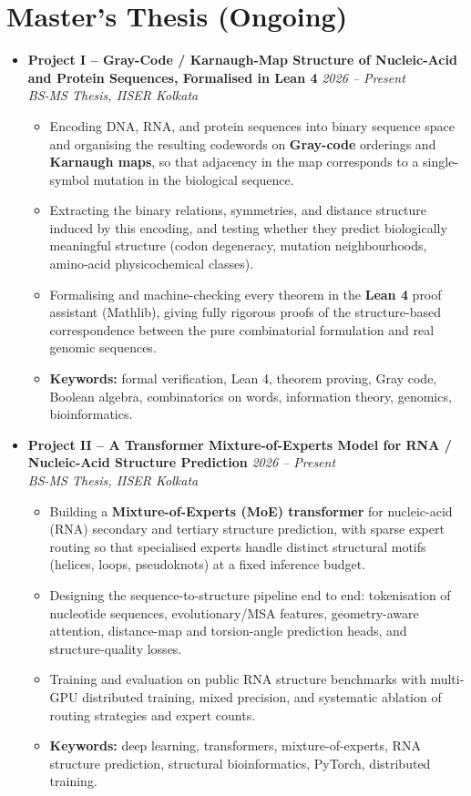 \documentclass[a4paper,10pt]{article}
\newcommand{\resumeProject}[4]{
    \item\small{
        \textbf{#1} \hfill \textit{#2}\\
        \textit{#3}\\
        \begin{itemize}[leftmargin=1.5em,label=\textbullet,nosep,itemsep=0.5pt]
            #4
        \end{itemize}
    }\vspace{2pt}
}
\newcommand{\compactSection}[2]{
    \section{#1}
    \vspace{-0.1cm}
    #2
    \vspace{-0.2cm}
}
\begin{document}
\compactSection{Master's Thesis (Ongoing)}{
\begin{itemize}[leftmargin=*,label={},itemsep=4pt]

    \resumeProject{Project I -- Gray-Code / Karnaugh-Map Structure of Nucleic-Acid and Protein Sequences, Formalised in Lean 4}{2026 -- Present}
    {BS-MS Thesis, IISER Kolkata}
    {\item Encoding DNA, RNA, and protein sequences into binary sequence space and organising the resulting codewords on \textbf{Gray-code} orderings and \textbf{Karnaugh maps}, so that adjacency in the map corresponds to a single-symbol mutation in the biological sequence.
    \item Extracting the binary relations, symmetries, and distance structure induced by this encoding, and testing whether they predict biologically meaningful structure (codon degeneracy, mutation neighbourhoods, amino-acid physicochemical classes).
    \item Formalising and machine-checking every theorem in the \textbf{Lean 4} proof assistant (Mathlib), giving fully rigorous proofs of the structure-based correspondence between the pure combinatorial formulation and real genomic sequences.
    \item \textbf{Keywords:} formal verification, Lean 4, theorem proving, Gray code, Boolean algebra, combinatorics on words, information theory, genomics, bioinformatics.}

    \resumeProject{Project II -- A Transformer Mixture-of-Experts Model for RNA / Nucleic-Acid Structure Prediction}{2026 -- Present}
    {BS-MS Thesis, IISER Kolkata}
    {\item Building a \textbf{Mixture-of-Experts (MoE) transformer} for nucleic-acid (RNA) secondary and tertiary structure prediction, with sparse expert routing so that specialised experts handle distinct structural motifs (helices, loops, pseudoknots) at a fixed inference budget.
    \item Designing the sequence-to-structure pipeline end to end: tokenisation of nucleotide sequences, evolutionary/MSA features, geometry-aware attention, distance-map and torsion-angle prediction heads, and structure-quality losses.
    \item Training and evaluation on public RNA structure benchmarks with multi-GPU distributed training, mixed precision, and systematic ablation of routing strategies and expert counts.
    \item \textbf{Keywords:} deep learning, transformers, mixture-of-experts, RNA structure prediction, structural bioinformatics, PyTorch, distributed training.}

\end{itemize}
}
\end{document}
